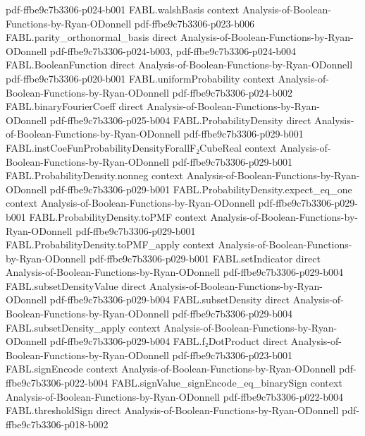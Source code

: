 \begin{theorem}
  {pdf-ffbe9c7b3306-p024-b001}
\proofstep
  {FABL.walshBasis}
  {context}
  {Analysis-of-Boolean-Functions-by-Ryan-ODonnell}
  {pdf-ffbe9c7b3306-p023-b006}
\proofstep
  {FABL.parity_orthonormal_basis}
  {direct}
  {Analysis-of-Boolean-Functions-by-Ryan-ODonnell}
  {pdf-ffbe9c7b3306-p024-b003,
    pdf-ffbe9c7b3306-p024-b004}
\proofstep
  {FABL.BooleanFunction}
  {direct}
  {Analysis-of-Boolean-Functions-by-Ryan-ODonnell}
  {pdf-ffbe9c7b3306-p020-b001}
\proofstep
  {FABL.uniformProbability}
  {context}
  {Analysis-of-Boolean-Functions-by-Ryan-ODonnell}
  {pdf-ffbe9c7b3306-p024-b002}
\proofstep
  {FABL.binaryFourierCoeff}
  {direct}
  {Analysis-of-Boolean-Functions-by-Ryan-ODonnell}
  {pdf-ffbe9c7b3306-p025-b004}
\proofstep
  {FABL.ProbabilityDensity}
  {direct}
  {Analysis-of-Boolean-Functions-by-Ryan-ODonnell}
  {pdf-ffbe9c7b3306-p029-b001}
\proofstep
  {FABL.instCoeFunProbabilityDensityForallF₂CubeReal}
  {context}
  {Analysis-of-Boolean-Functions-by-Ryan-ODonnell}
  {pdf-ffbe9c7b3306-p029-b001}
\proofstep
  {FABL.ProbabilityDensity.nonneg}
  {context}
  {Analysis-of-Boolean-Functions-by-Ryan-ODonnell}
  {pdf-ffbe9c7b3306-p029-b001}
\proofstep
  {FABL.ProbabilityDensity.expect_eq_one}
  {context}
  {Analysis-of-Boolean-Functions-by-Ryan-ODonnell}
  {pdf-ffbe9c7b3306-p029-b001}
\proofstep
  {FABL.ProbabilityDensity.toPMF}
  {context}
  {Analysis-of-Boolean-Functions-by-Ryan-ODonnell}
  {pdf-ffbe9c7b3306-p029-b001}
\proofstep
  {FABL.ProbabilityDensity.toPMF_apply}
  {context}
  {Analysis-of-Boolean-Functions-by-Ryan-ODonnell}
  {pdf-ffbe9c7b3306-p029-b001}
\proofstep
  {FABL.setIndicator}
  {direct}
  {Analysis-of-Boolean-Functions-by-Ryan-ODonnell}
  {pdf-ffbe9c7b3306-p029-b004}
\proofstep
  {FABL.subsetDensityValue}
  {direct}
  {Analysis-of-Boolean-Functions-by-Ryan-ODonnell}
  {pdf-ffbe9c7b3306-p029-b004}
\proofstep
  {FABL.subsetDensity}
  {direct}
  {Analysis-of-Boolean-Functions-by-Ryan-ODonnell}
  {pdf-ffbe9c7b3306-p029-b004}
\proofstep
  {FABL.subsetDensity_apply}
  {context}
  {Analysis-of-Boolean-Functions-by-Ryan-ODonnell}
  {pdf-ffbe9c7b3306-p029-b004}
\proofstep
  {FABL.f₂DotProduct}
  {direct}
  {Analysis-of-Boolean-Functions-by-Ryan-ODonnell}
  {pdf-ffbe9c7b3306-p023-b001}
\proofstep
  {FABL.signEncode}
  {context}
  {Analysis-of-Boolean-Functions-by-Ryan-ODonnell}
  {pdf-ffbe9c7b3306-p022-b004}
\proofstep
  {FABL.signValue_signEncode_eq_binarySign}
  {context}
  {Analysis-of-Boolean-Functions-by-Ryan-ODonnell}
  {pdf-ffbe9c7b3306-p022-b004}
\proofstep
  {FABL.thresholdSign}
  {direct}
  {Analysis-of-Boolean-Functions-by-Ryan-ODonnell}
  {pdf-ffbe9c7b3306-p018-b002}

\end{theorem}
